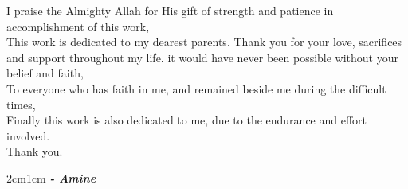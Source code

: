 

\begin{fquote}
\begin{center}
\large{

I praise the Almighty Allah for His gift of strength and patience in accomplishment of this work,\\[12pt]
This work is dedicated to my dearest parents. Thank you for your love, sacrifices and support throughout my life. it would have never been possible without your belief and faith,\\[12pt]
To everyone who has faith in me, and remained beside me during the difficult times,\\[12pt]
Finally this work is also dedicated to me, due to the endurance and effort involved.\\[12pt]
Thank you.
}
\end{center}
\bigskip
\medskip
\end{fquote}

\begin{adjustwidth}{2cm}{1cm}
\hspace*{\fill} \textbf{\textit{\large{- Amine}}}
\end{adjustwidth}

\clearpage